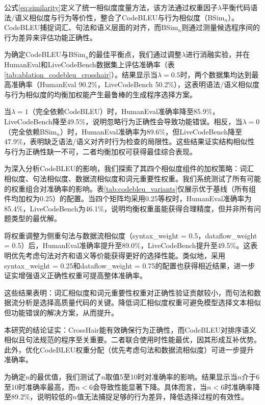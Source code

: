 \documentclass{article}
\newcommand{\tool}{EnsLLM}
\begin{document}
\leavevmode\par
公式\ref{eq:similarity}定义了统一相似度度量方法，该方法通过权重因子\(\lambda\)平衡代码语法/语义相似度与行为等价性，整合了CodeBLEU与行为相似度（BSim\(_n\)）。CodeBLEU捕捉词汇、句法和语义层面的对齐，而BSim\(_n\)则通过测量候选程序间的行为差异来评估功能正确性。

为确定CodeBLEU与BSim\(_n\)的最佳平衡点，我们通过调整\(\lambda\)进行消融实验，并在HumanEval和LiveCodeBench数据集上评估准确率（表\ref{tab:ablation_codebleu_crosshair}）。结果显示当\(\lambda = 0.5\)时，两个数据集均达到最高准确率（HumanEval 90.2\%，LiveCodeBench 50.2\%），这表明语法/语义相似度与行为相似度的均衡加权能产生最鲁棒的生成程序选择方案。

当\(\lambda = 1\)（完全依赖CodeBLEU）时，HumanEval准确率降至85.9\%，LiveCodeBench降至49.5\%，说明忽略行为正确性会导致功能错误。相反，当\(\lambda = 0\)（完全依赖BSim\(_n\)）时，HumanEval准确率为89.6\%，但LiveCodeBench降至47.9\%，表明缺乏语法/语义对齐时行为检查的局限性。这些结果证实结构相似性与行为正确性缺一不可，二者均衡加权可获得最佳综合表现。

为深入分析CodeBLEU的影响，我们探索了其四个相似度组件的加权策略：词汇相似度、句法相似度、数据流相似度和词元重要性权重。我们系统测试了所有可能的权重组合对准确率的影响。表\ref{tab:codebleu_variants}仅展示优于基线（所有组件均加权为0.25）的配置。当四个矩阵均采用0.25等权时，HumanEval准确率为85.4\%，LiveCodeBench为46.1\%，说明均衡权重虽能获得合理精度，但并非所有问题类型的最优解。

将权重调整为侧重句法与数据流相似度（syntax\_weight = 0.5，dataflow\_weight = 0.5）后，HumanEval准确率提升至89.0\%，LiveCodeBench提升至49.5\%。这表明优先考虑句法对齐和语义等价能获得更好的选择性能。类似地，采用syntax\_weight = 0.25和dataflow\_weight = 0.75的配置也获得相近结果，进一步证实增强语义正确性权重可提高整体准确率。

这些结果表明：词汇相似度和词元重要性权重对正确性验证贡献较小，而句法和数据流分析是选择高质量代码的关键。降低词汇相似度权重可避免模型选择文本相似但功能错误的解决方案，从而提升。

本研究的结论证实：CrossHair能有效确保行为正确性，而CodeBLEU对排序语义相似且句法规范的程序至关重要。二者联合使用时性能最优，因其形成互补优势。此外，优化CodeBLEU权重分配（优先考虑句法和数据流相似度）可进一步提升准确率。

为确定\( n \)的最优值，我们测试了\( n \)取值5至10时对准确率的影响。结果显示当\( n \)介于6至10时准确率最高，而\( n < 6 \)会导致性能显著下降。具体而言，当\( n < 6 \)时准确率降至89.2\%，说明较低的\( n \)值无法捕捉足够的行为差异，降低选择过程的有效性。
\end{document}
